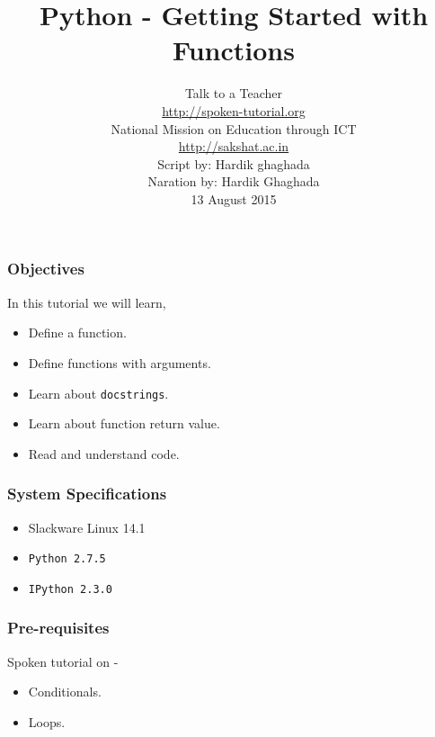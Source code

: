 \documentclass[17pt,compress]{beamer}
\author[FOSSEE]{}
\institute[IIT Bombay]{}
\date[]{}
\begin{document}
\sffamily \bfseries
\title
[Getting Started with Functions]
{Python - Getting Started with Functions}
\author
[FOSSEE, IIT - Bombay]
{\small Talk to a Teacher\\{\color{blue}\url{http://spoken-tutorial.org}}\\National Mission on Education
 through ICT\\{\color{blue}\url{http://sakshat.ac.in}} \\[0.5cm]{\tiny Script by: Hardik ghaghada \\ Naration by: Hardik Ghaghada \\ 13 August 2015}}

\begin{frame}
   \titlepage
\end{frame}
\begin{frame}
\frametitle{Objectives}
\label{sec-2}

  In this tutorial we will learn, \pause


\begin{itemize}
\item Define a function.\pause
\item Define functions with arguments.\pause
\item Learn about \texttt{docstrings}.\pause
\item Learn about function return value.\pause
\item Read and understand code.
\end{itemize}
\end{frame}
\begin{frame}
\frametitle{System Specifications}\pause
\begin{itemize}
\item Slackware Linux 14.1\pause
\item \texttt{Python 2.7.5} \pause
\item \texttt{IPython 2.3.0}
\end{itemize}
\end{frame}
\begin{frame}
\frametitle{Pre-requisites}
\label{sec-3}

Spoken tutorial on -

\begin{itemize}
\item Conditionals.\pause
\item Loops.
\end{itemize}
\end{frame}
\end{document}
